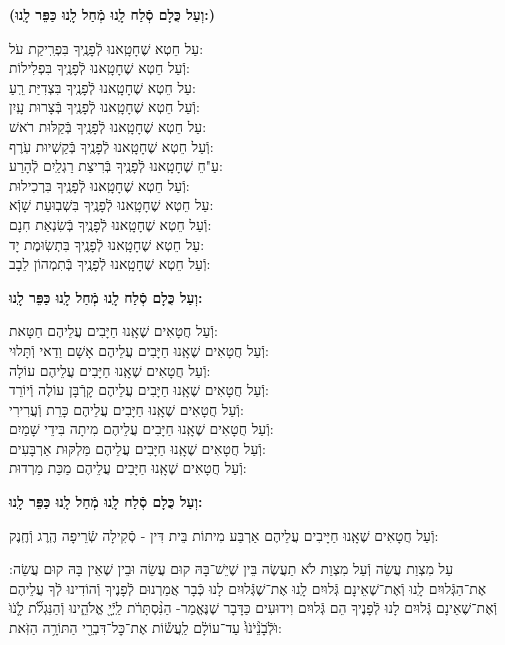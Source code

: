 \documentclass[twoside, openany, parskip=half, 11pt]{book}
\begin{document}
\textbf{(וְעַל כֻּלָם סְֿלַח לָֽנוּ מְֿחַל לָֽנוּ כַּפֵּר לָֽנוּ:)}

עַל חֵטְא שֶׁחָטָֽאנוּ לְֿפָנֶֽיךָ בִּפְרִֽיקַת עֹל:\\ וְֿעַל חֵטְא שֶׁחָטָֽאנוּ לְֿפָנֶֽיךָ בִּפְלִילוֹת: \\
עַל חֵטְא שֶׁחָטָֽאנוּ לְֿפָנֶֽיךָ בִּצְדִיַּת רֵֽעַ: \\ וְֿעַל חֵטְא שֶׁחָטָֽאנוּ לְֿפָנֶֽיךָ בְּֿצָרוּת עָֽיִן: \\
עַל חֵטְא שֶׁחָטָֽאנוּ לְֿפָנֶֽיךָ בְּֿקַלּוּת רֹאשׁ:\\ וְֿעַל חֵטְא שֶׁחָטָֽאנוּ לְֿפָנֶֽיךָ בְּֿקַשְׁיוּת עֹֽרֶף: \\
עַ"חֵ שֶׁחָטָֽאנוּ לְֿפָנֶֽיךָ בְּֿרִיצַת רַגְלַֽיִם לְֿהָרַע:\\ וְֿעַל חֵטְא שֶׁחָטָֽאנוּ לְֿפָנֶֽיךָ בִּרְכִילוּת: \\
עַל חֵטְא שֶׁחָטָֽאנוּ לְֿפָנֶֽיךָ בִּשְׁבֽוּעַת שָׁוְֿא: \\ וְֿעַל חֵטְא שֶׁחָטָֽאנוּ לְֿפָנֶֽיךָ בְּֿשִׂנְאַת חִנָם: \\
עַל חֵטְא שֶׁחָטָֽאנוּ לְֿפָנֶֽיךָ בִּתְשֽׂוּמֶת יָד:\\ וְֿעַל חֵטְא שֶׁחָטָֽאנוּ לְֿפָנֶֽיךָ בְּֿתִמְהוֹן לֵבָב:

\textbf{וְעַל כֻּלָם סְֿלַח לָֽנוּ מְֿחַל לָֽנוּ כַּפֵּר לָֽנוּ:}


וְֿעַל חֲטָאִים שֶׁאָֽנוּ חַיָּבִים עֲלֵיהֶם חַטָּאת:\\
וְֿעַל חֲטָאִים שֶׁאָֽנוּ חַיָּבִים עֲלֵיהֶם אָשָׁם וַדַאי וְֿתָּלוּי:\\
וְֿעַל חֲטָאִים שֶׁאָֽנוּ חַיָּבִים עֲלֵיהֶם עוֹלָה:\\
וְֿעַל חֲטָאִים שֶׁאָֽנוּ חַיָּבִים עֲלֵיהֶם קָרְֿבָּן עוֹלֶה וְֿיוֹרֵד:\\
וְֿעַל חֲטָאִים שֶׁאָֽנוּ חַיָּבִים עֲלֵיהֶם כָּרֵת וְֿעֲרִירִי:\\
וְֿעַל חֲטָאִים שֶׁאָֽנוּ חַיָּבִים עֲלֵיהֶם מִיתָה בִּידֵי שָׁמַיִם:\\
וְֿעַל חֲטָאִים שֶׁאָֽנוּ חַיָּבִים עֲלֵיהֶם מַּלְקּוּת אַרְבָּעִים:\\
וְֿעַל חֲטָאִים שֶׁאָֽנוּ חַיָּבִים עֲלֵיהֶם מַכַּת מַרְדוּת:



\textbf{וְעַל כֻּלָם סְֿלַח לָֽנוּ מְֿחַל לָֽנוּ כַּפֵּר לָֽנוּ:}

וְֿעַל חֲטָאִים שֶׁאָֽנוּ חַיָּיבִים עֲלֵיהֶם אַרְבַּע מִיתוֹת בֵּית דִּין - סְֿקִילָה שְֿׂרֵיפָה הֶֽרֶג וְֿחֶֽנֶק:

עַל מִצְוַת עֲשֵׂה וְֿעַל מִצְוַת לֹא תַעֲשֶׂה בֵּין שֶׁיֵשׁ־בָּהּ קוּם עֲשֵׂה וּבֵין שֶׁאֵין בָּהּ קוּם עֲשֵׂה: אֶת־הַגְּֿלוּיִם לָֽנוּ וְֿאֶת־שֶׁאֵינָם גְּֿלוּיִם לָֽנוּ אֶת־שֶׁגְּֿלוּיִם לָנוּ כְּֿבָר אֲמַרְנוּם לְֿפָנֶיךָ וְֿהוֹדִינוּ לְֿךָ עֲלֵיהֶם וְֿאֶת־שֶׁאֵינָם גְּֿלוּיִם לָנוּ לְֿפָנֶיךָ הֵם גְּֿלוּיִם וִידוּעִים כַּדָּבָר שֶׁנֶּאֱמַר- הַנִּ֨סְתָּרֹ֔ת
לַֽיְֿיָ֖ אֱלֹהֵ֑ינוּ וְֿהַנִּגְלֹ֞ת לָֹ֤נֹוֹּ וֹּלְֹֿבָֹנֵֹ֨יֹנֹוֹּ֙ עַד־עוֹלָ֔ם לַֽעֲשׂ֕וֹת אֶת־כׇּל־דִּבְרֵ֖י הַתּוֹרָ֥ה הַזֹּֽאת:
\end{document}

